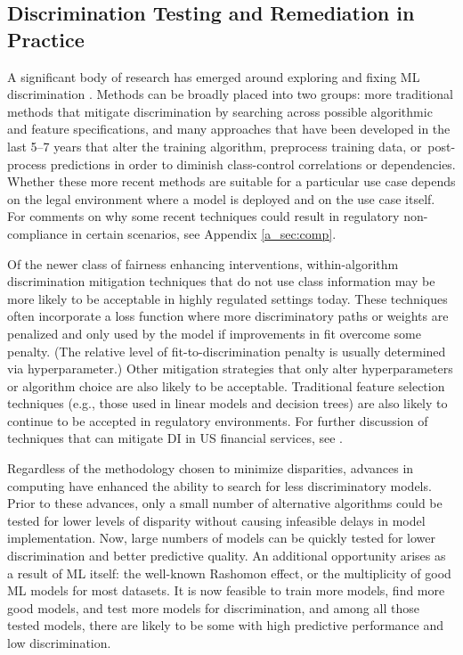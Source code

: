 \documentclass[information,article,accept,moreauthors,pdftex]{Definitions/mdpi}
\begin{document}
\subsection{Discrimination Testing and Remediation in Practice}\label{ssec:disc_rem}

A significant body of research has emerged around exploring and fixing ML discrimination \cite{friedler2019comparative}. Methods can be broadly placed into two groups: more traditional methods that mitigate discrimination by searching across possible algorithmic and feature specifications, and many approaches that have been developed in the last 5--7 years that alter the training algorithm, preprocess training data, or~post-process predictions in order to diminish class-control correlations or dependencies. Whether these more recent methods are suitable for a particular use case depends on the legal environment where a model is deployed and on the use case itself. For comments on why some recent techniques could result in regulatory non-compliance in certain scenarios, see Appendix \ref{a_sec:comp}.

Of the newer class of fairness enhancing interventions, within-algorithm discrimination mitigation techniques that do not use class information may be more likely to be acceptable in highly regulated settings today. These techniques often incorporate a loss function where more discriminatory paths or weights are penalized and only used by the model if improvements in fit overcome some penalty. (The relative level of fit-to-discrimination penalty is usually determined via hyperparameter.) Other mitigation strategies that only alter hyperparameters or algorithm choice are also likely to be acceptable. Traditional feature selection techniques (e.g., those used in linear models and decision trees) are also likely to continue to be accepted in regulatory environments. For further discussion of techniques that can mitigate DI in US financial services, see \citet{schmidt2019introduction}. 

Regardless of the methodology chosen to minimize disparities, advances in computing have enhanced the ability to search for less discriminatory models.  Prior to these advances, only a small number of alternative algorithms could be tested for lower levels of disparity without causing infeasible delays in model implementation.  Now, large numbers of models can be quickly tested for lower discrimination and better predictive quality.  An additional opportunity arises as a result of ML itself: the well-known Rashomon effect, or the multiplicity of good ML models for most datasets. It is now feasible to train more models, find more good models, and test more models for discrimination, and among all those tested models, there are likely to be some with high predictive performance and low discrimination.
\end{document}
